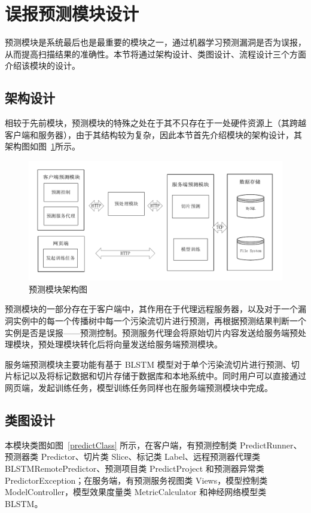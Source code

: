 \section{误报预测模块设计}

预测模块是系统最后也是最重要的模块之一，通过机器学习预测漏洞是否为误报，从而提高扫描结果的准确性。本节将通过架构设计、类图设计、流程设计三个方面介绍该模块的设计。

\subsection{架构设计}

相较于先前模块，预测模块的特殊之处在于其不只存在于一处硬件资源上（其跨越客户端和服务器），由于其结构较为复杂，因此本节首先介绍模块的架构设计，其架构图如图~\ref{predictArch}所示。

\begin{figure}[!htbp]
    \centering
    \includegraphics[width=0.8\linewidth]{FIGs/chapter3/predict-architecture.pdf}
    \caption{预测模块架构图}\label{predictArch}
\end{figure}

预测模块的一部分存在于客户端中，其作用在于代理远程服务器，以及对于一个漏洞实例中的每一个传播树中每一个污染流切片进行预测，再根据预测结果判断一个实例是否是误报——预测控制。预测服务代理会将原始切片内容发送给服务端预处理模块，预处理模块转化后将向量发送给服务端预测模块。

服务端预测模块主要功能有基于 BLSTM 模型对于单个污染流切片进行预测、切片标记以及将标记数据和切片存储于数据库和本地系统中。同时用户可以直接通过网页端，发起训练任务，模型训练任务同样也在服务端预测模块中完成。

\subsection{类图设计}

本模块类图如图~\ref{predictClass} 所示，在客户端，有预测控制类 PredictRunner、预测器类 Predictor、切片类 Slice、标记类 Label、远程预测器代理类 BLSTMRemotePredictor、预测项目类 PredictProject 和预测器异常类 PredictorException；在服务端，有预测服务视图类 Views，模型控制类 ModelController，模型效果度量类 MetricCalculator 和神经网络模型类 BLSTM。

